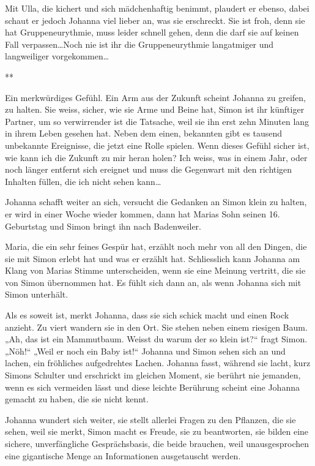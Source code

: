 \documentclass[10pt,titlepage,a5paper]{book}
\newcommand{\sterne}{\par{\centering ***\par}}
\begin{document}
Mit Ulla, die kichert und sich mädchenhaftig benimmt, plaudert er ebenso, dabei schaut er jedoch Johanna viel lieber an, was sie erschreckt. Sie ist froh, denn sie hat Gruppeneurythmie, muss leider  schnell gehen, denn die darf sie auf keinen Fall verpassen\dots  Noch nie ist ihr die Gruppeneurythmie langatmiger und langweiliger vorgekommen\dots 

\sterne

Ein merkwürdiges Gefühl. Ein Arm aus der Zukunft scheint Johanna zu greifen, zu halten. Sie weiss, sicher, wie sie Arme und Beine hat, Simon ist ihr künftiger Partner, um so verwirrender ist die Tatsache, weil sie ihn erst zehn Minuten lang in ihrem Leben gesehen hat. Neben dem einen, bekannten gibt es tausend unbekannte Ereignisse, die jetzt eine Rolle spielen. Wenn dieses Gefühl sicher ist, wie kann ich die Zukunft zu mir heran holen? Ich weiss, was in einem Jahr, oder noch länger entfernt sich ereignet und muss die Gegenwart mit den richtigen Inhalten füllen, die ich nicht sehen kann\dots 

Johanna schafft weiter an sich, versucht die Gedanken an Simon klein zu halten, er wird in einer Woche wieder kommen, dann hat Marias Sohn seinen 16. Geburtstag und Simon bringt ihn nach Badenweiler.

Maria, die ein sehr feines Gespür hat, erzählt noch mehr von all den Dingen, die sie mit Simon erlebt hat und was er erzählt hat. Schliesslich kann Johanna am Klang von Marias Stimme unterscheiden, wenn sie eine Meinung vertritt, die sie von Simon übernommen hat. Es fühlt sich dann an, als wenn Johanna sich mit Simon unterhält. 

 Als es soweit ist, merkt Johanna, dass sie sich schick macht und einen Rock anzieht. Zu viert wandern sie in den Ort. Sie stehen neben einem riesigen Baum. „Ah, das ist ein Mammutbaum. Weisst du warum der so klein ist?“ fragt Simon. „Nöh!“ „Weil er noch ein Baby ist!“ Johanna und Simon sehen sich an und lachen, ein fröhliches aufgedrehtes Lachen. Johanna fasst, während sie lacht, kurz Simons Schulter und erschrickt im gleichen Moment, sie be\-rührt nie jemanden, wenn es sich vermeiden lässt und diese leichte Berührung scheint eine Johanna gemacht zu haben, die sie nicht kennt.
 
Johanna wundert sich weiter, sie stellt allerlei Fragen zu den Pflanzen, die sie sehen, weil sie merkt, Simon macht es Freude, sie zu beantworten, sie bilden eine sichere, unverfängliche Gesprächsbasis, die beide brauchen, weil unausgesprochen eine gigantische Menge an Informationen ausgetauscht werden.
\end{document}
